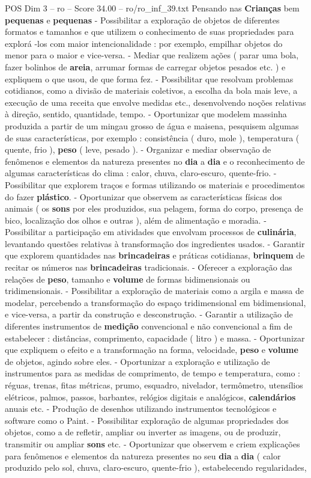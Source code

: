 \begin{textsample}{POS Dim 3 – ro – Score 34.00 – ro/ro\_inf\_39.txt}
Pensando nas \textbf{Crianças} bem \textbf{pequenas} e \textbf{pequenas} - Possibilitar a exploração de objetos de diferentes formatos e tamanhos e que utilizem o conhecimento de suas propriedades para explorá -los com maior intencionalidade : por exemplo, empilhar objetos do menor para o maior e vice-versa. - Mediar que realizem ações ( parar uma bola, fazer bolinhos de \textbf{areia}, arrumar formas de carregar objetos pesados etc. ) e expliquem o que usou, de que forma fez. - Possibilitar que resolvam problemas cotidianos, como a divisão de materiais coletivos, a escolha da bola mais leve, a execução de uma receita que envolve medidas etc., desenvolvendo noções relativas à direção, sentido, quantidade, tempo. - Oportunizar que modelem massinha produzida a partir de um mingau grosso de água e maisena, pesquisem algumas de suas características, por exemplo : consistência ( duro, mole ), temperatura ( quente, frio ), \textbf{peso} ( leve, pesado ). - Organizar e mediar observação de fenômenos e elementos da natureza presentes no \textbf{dia} a \textbf{dia} e o reconhecimento de algumas características do clima : calor, chuva, claro-escuro, quente-frio. - Possibilitar que explorem traços e formas utilizando os materiais e procedimentos do fazer \textbf{plástico}. - Oportunizar que observem as características físicas dos animais ( os \textbf{sons} por eles produzidos, sua pelagem, forma do corpo, presença de bico, localização dos olhos e outras ), além de alimentação e moradia. - Possibilitar a participação em atividades que envolvam processos de \textbf{culinária}, levantando questões relativas à transformação dos ingredientes usados. - Garantir que explorem quantidades nas \textbf{brincadeiras} e práticas cotidianas, \textbf{brinquem} de recitar os números nas \textbf{brincadeiras} tradicionais. - Oferecer a exploração das relações de \textbf{peso}, tamanho e \textbf{volume} de formas bidimensionais ou tridimensionais. - Possibilitar a exploração de materiais como a argila e massa de modelar, percebendo a transformação do espaço tridimensional em bidimensional, e vice-versa, a partir da construção e desconstrução. - Garantir a utilização de diferentes instrumentos de \textbf{medição} convencional e não convencional a fim de estabelecer : distâncias, comprimento, capacidade ( litro ) e massa. - Oportunizar que expliquem o efeito e a transformação na forma, velocidade, \textbf{peso} e \textbf{volume} de objetos, agindo sobre eles. - Oportunizar a exploração e utilização de instrumentos para as medidas de comprimento, de tempo e temperatura, como : réguas, trenas, fitas métricas, prumo, esquadro, nivelador, termômetro, utensílios elétricos, palmos, passos, barbantes, relógios digitais e analógicos, \textbf{calendários} anuais etc. - Produção de desenhos utilizando instrumentos tecnológicos e software como o Paint. - Possibilitar exploração de algumas propriedades dos objetos, como a de refletir, ampliar ou inverter as imagens, ou de produzir, transmitir ou ampliar \textbf{sons} etc. - Oportunizar que observem e criem explicações para fenômenos e elementos da natureza presentes no seu \textbf{dia} a \textbf{dia} ( calor produzido pelo sol, chuva, claro-escuro, quente-frio ), estabelecendo regularidades, 
\end{textsample}
